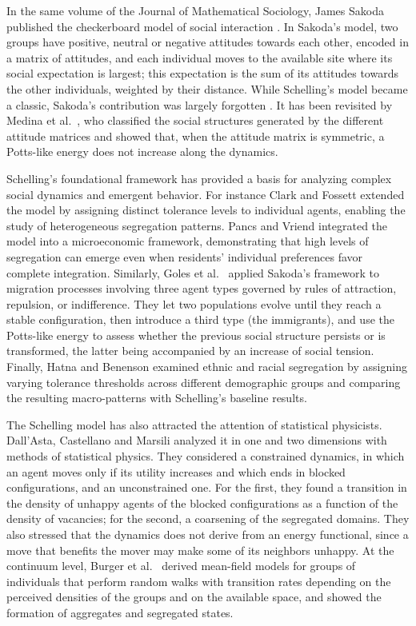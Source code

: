 \documentclass{article}
\theoremstyle{remark}
\begin{document}
In the same volume of the Journal of Mathematical Sociology, James Sakoda published the checkerboard model of social interaction \cite{sakoda1971checkerboard}. In Sakoda's model, two groups have positive, neutral or negative attitudes towards each other, encoded in a matrix of attitudes, and each individual moves to the available site where its social expectation is largest; this expectation is the sum of its attitudes towards the other individuals, weighted by their distance. While Schelling's model became a classic, Sakoda's contribution was largely forgotten \cite{hegselmann2017schelling}. It has been revisited by Medina et al.\ \cite{medina2017self}, who classified the social structures generated by the different attitude matrices and showed that, when the attitude matrix is symmetric, a Potts-like energy does not increase along the dynamics.

Schelling's foundational framework has provided a basis for analyzing complex social dynamics and emergent behavior. For instance Clark and Fossett \cite{clark2008understanding} extended the model by assigning distinct tolerance levels to individual agents, enabling the study of heterogeneous segregation patterns. Pancs and Vriend \cite{pancs2007schelling} integrated the model into a microeconomic framework, demonstrating that high levels of segregation can emerge even when residents' individual preferences favor complete integration. Similarly, Goles et al.\ \cite{goles2020migration} applied Sakoda's framework to migration processes involving three agent types governed by rules of attraction, repulsion, or indifference. They let two populations evolve until they reach a stable configuration, then introduce a third type (the immigrants), and use the Potts-like energy to assess whether the previous social structure persists or is transformed, the latter being accompanied by an increase of social tension. Finally, Hatna and Benenson \cite{hatna2012schelling} examined ethnic and racial segregation by assigning varying tolerance thresholds across different demographic groups and comparing the resulting macro-patterns with Schelling's baseline results.

The Schelling model has also attracted the attention of statistical physicists. Dall'Asta, Castellano and Marsili \cite{dallasta2008statistical} analyzed it in one and two dimensions with methods of statistical physics. They considered a constrained dynamics, in which an agent moves only if its utility increases and which ends in blocked configurations, and an unconstrained one. For the first, they found a transition in the density of unhappy agents of the blocked configurations as a function of the density of vacancies; for the second, a coarsening of the segregated domains. They also stressed that the dynamics does not derive from an energy functional, since a move that benefits the mover may make some of its neighbors unhappy. At the continuum level, Burger et al.\ \cite{burger2019mean} derived mean-field models for groups of individuals that perform random walks with transition rates depending on the perceived densities of the groups and on the available space, and showed the formation of aggregates and segregated states.
\end{document}
